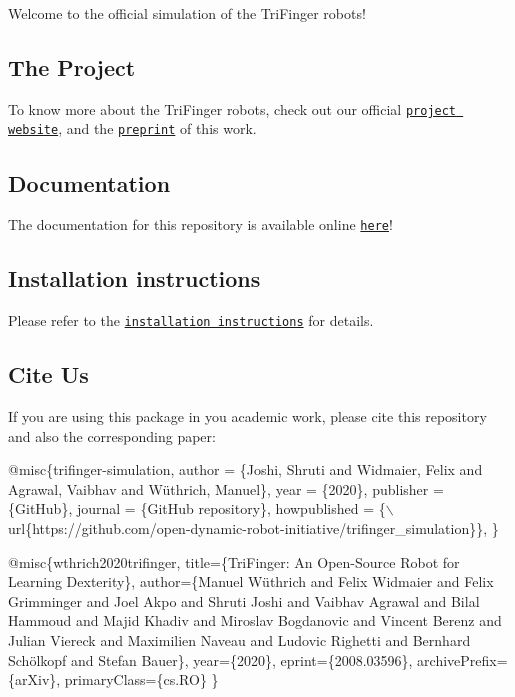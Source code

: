 Welcome to the official simulation of the Tri\+Finger robots!

  

\subsection*{The Project}

To know more about the Tri\+Finger robots, check out our official \href{https://sites.google.com/view/trifinger}{\tt project website}, and the \href{https://arxiv.org/abs/2008.03596}{\tt preprint} of this work.

\subsection*{Documentation}

The documentation for this repository is available online \href{https://trifinger-robot-simulation.readthedocs.io/en/latest/}{\tt here}!

\subsection*{Installation instructions}

Please refer to the \href{https://trifinger-robot-simulation.readthedocs.io/en/latest/getting_started/installation.html}{\tt installation instructions} for details.

\subsection*{Cite Us}

If you are using this package in you academic work, please cite this repository and also the corresponding paper\+:


\begin{DoxyCode}
@misc\{trifinger-simulation,
  author = \{Joshi, Shruti and Widmaier, Felix and Agrawal, Vaibhav and Wüthrich, Manuel\},
  year = \{2020\},
  publisher = \{GitHub\},
  journal = \{GitHub repository\},
  howpublished = \{\(\backslash\)url\{https://github.com/open-dynamic-robot-initiative/trifinger\_simulation\}\},
\}
\end{DoxyCode}



\begin{DoxyCode}
@misc\{wthrich2020trifinger,
    title=\{TriFinger: An Open-Source Robot for Learning Dexterity\},
    author=\{Manuel Wüthrich and Felix Widmaier and Felix Grimminger and Joel Akpo and Shruti Joshi and
       Vaibhav Agrawal and Bilal Hammoud and Majid                             Khadiv and Miroslav Bogdanovic and
       Vincent Berenz and Julian Viereck and Maximilien Naveau and Ludovic Righetti and Bernhard Schölkopf and Stefan
       Bauer\},
    year=\{2020\},
    eprint=\{2008.03596\},
    archivePrefix=\{arXiv\},
    primaryClass=\{cs.RO\}
\}
\end{DoxyCode}
 